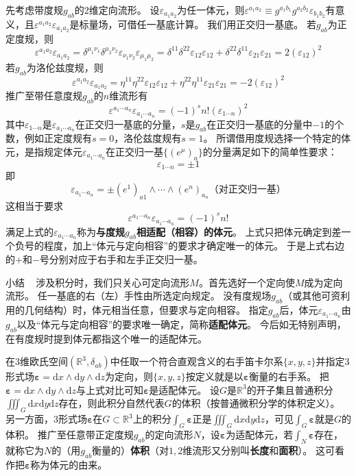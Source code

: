 先考虑带度规$g_{ab}$的$2$维定向流形。
设$\varepsilon_{a_1a_2}$为任一体元，则$\varepsilon^{a_1a_2} \equiv g^{a_1b_1}g^{a_2b_2}\varepsilon_{b_1b_2}$有意义，且$\varepsilon^{a_1a_2}\varepsilon_{a_1a_2}$是标量场，可借任一基底计算。
我们用正交归一基底。
若$g_{ab}$为正定度规，则
$$\varepsilon^{a_1a_2}\varepsilon_{a_1a_2} = \delta^{\mu_1\nu_1}\delta^{\mu_2\nu_2}\varepsilon_{\nu_1\nu_2}\varepsilon_{\mu_1\mu_2} = \delta^{11}\delta^{22}\varepsilon_{12}\varepsilon_{12} + \delta^{22}\delta^{11}\varepsilon_{21}\varepsilon_{21} = 2(\varepsilon_{12})^2$$
若$g_{ab}$为洛伦兹度规，则
$$\varepsilon^{a_1a_2}\varepsilon_{a_1a_2} = \eta^{11}\eta^{22}\varepsilon_{12}\varepsilon_{12} + \eta^{22}\eta^{11}\varepsilon_{21}\varepsilon_{21} = -2(\varepsilon_{12})^2$$
推广至带任意度规$g_{ab}$的$n$维流形有
$$\varepsilon^{a_1 \cdots a_n}\varepsilon_{a_1 \cdots a_n} = (-1)^sn!(\varepsilon_{1 \cdots n})^2$$
其中$\varepsilon_{1 \cdots n}$是$\varepsilon_{a_1 \cdots a_n}$在正交归一基底的分量，$s$是$g_{ab}$在正交归一基底的分量中$-1$的个数，例如正定度规有$s = 0$，洛伦兹度规有$s = 1$。
所谓借用度规选择一个特定的体元，是指规定体元$\varepsilon_{a_1 \cdots a_n}$在正交归一基$\{(e^\mu)_a\}$的分量满足如下的简单性要求：
$$\varepsilon_{1 \cdots n} = \pm 1$$
即
$$\varepsilon_{a_1 \cdots a_n} = \pm(e^1)_{a1} \wedge \cdots \wedge(e^n)_{a_n} \text{（对正交归一基）}$$
这相当于要求
$$\varepsilon^{a_1 \cdots a_n}\varepsilon_{a_1 \cdots a_n} = (-1)^sn!$$
满足上式的$\varepsilon_{a_1 \cdots a_n}$称为\textbf{与度规$g_{ab}$相适配（相容）的体元}。
上式只把体元确定到差一个负号的程度，加上``体元与定向相容''的要求才确定唯一的体元。
于是上式右边的$+$和$-$号分别对应于右手和左手正交归一基。

小结 ~ 涉及积分时，我们只关心可定向流形$M$。首先选好一个定向使$M$成为定向流形。
任一基底的右（左）手性由所选定向规定。
没有度规场$g_{ab}$（或其他可资利用的几何结构）时，体元相当任意，但要求与定向相容。
指定$g_{ab}$后，体元$\varepsilon_{a_1 \cdots a_n}$由$g_{ab}$以及``体元与定向相容''的要求唯一确定，简称\textbf{适配体元}。
今后如无特别声明，在有度规时提到体元都指这个唯一的适配体元。

在$3$维欧氏空间$(\mathbb{R}^3, \delta_{ab})$中任取一个符合直观含义的右手笛卡尔系$\{x, y, z\}$并指定$3$形式场$\bm\varepsilon = \mathrm{d}x \wedge \mathrm{d}y \wedge \mathrm{d}z$为定向，则$\{x, y, z\}$按定义就是以$\bm\varepsilon$衡量的右手系。
把$\bm\varepsilon = \mathrm{d}x \wedge \mathrm{d}y \wedge \mathrm{d}z$与上式对比可知$\bm\varepsilon$是适配体元。
设$G$是$\mathbb{R}^3$的开子集且普通积分$\displaystyle\iiint_G\mathrm{d}x\mathrm{d}y\mathrm{d}z$存在，则此积分自然代表$G$的体积（按普通微积分学的体积定义）。
另一方面，$3$形式场$\bm\varepsilon$在$G \subset \mathbb{R}^3$上的积分$\displaystyle\int_G\bm\varepsilon$正是$\displaystyle\iiint_G\mathrm{d}x\mathrm{d}y\mathrm{d}z$，可见$\displaystyle\int_G\bm\varepsilon$就是$G$的体积。
推广至任意带正定度规$g_{ab}$的定向流形$N$，设$\bm\varepsilon$为适配体元，若$\displaystyle\int_N\bm\varepsilon$存在，就称它为$N$的（用$g_{ab}$衡量的）\textbf{体积}（对$1, 2$维流形又分别叫\textbf{长度}和\textbf{面积}）。
这可看作把$\bm\varepsilon$称为体元的由来。

